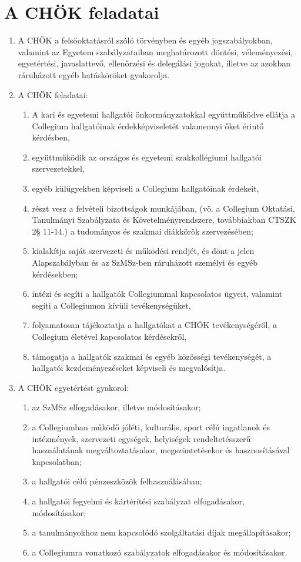 \documentclass{../styles/rulebook}
\begin{document}
\section{A CHÖK feladatai}

\begin{enumerate}
	\item A CHÖK a felsőoktatásról szóló törvényben és egyéb jogszabályokban, valamint az Egyetem szabályzataiban meghatározott döntési, véleményezési, egyetértési, javaslattevő, ellenőrzési és delegálási jogokat, illetve az azokban ráruházott egyéb hatásköröket gyakorolja.
	\item A CHÖK feladatai:
	\begin{enumerate}
		\item A kari és egyetemi hallgatói önkormányzatokkal együttműködve ellátja a Collegium hallgatóinak érdekképviseletét valamennyi őket érintő kérdésben,
		\item együttműködik az országos és egyetemi szakkollégiumi hallgatói szervezetekkel,
		\item egyéb külügyekben képviseli a Collegium hallgatóinak érdekeit,
		\item részt vesz a felvételi bizottságok munkájában, (vö. a Collegium Oktatási, Tanulmányi Szabályzata és Követelményrendszere, továbbiakban CTSZK 2§ 11-14.) a tudományos és szakmai diákkörök szervezésében;
		\item kialakítja saját szervezeti és működési rendjét, és dönt a jelen Alapszabályban és az SzMSz-ben ráruházott személyi és egyéb kérdésekben;
		\item intézi és segíti a hallgatók Collegiummal kapcsolatos ügyeit, valamint segíti a Collegiumon kívüli tevékenységüket,
		\item folyamatosan tájékoztatja a hallgatókat a CHÖK tevékenységéről, a Collegium életével kapcsolatos kérdésekről,
		\item támogatja a hallgatók szakmai és egyéb közösségi tevékenységét, a hallgatói kezdeményezéseket képviseli és megvalósítja.
	\end{enumerate}
	\item A CHÖK egyetértést gyakorol:
	\begin{enumerate}
		\item az SzMSz elfogadásakor, illetve módosításakor;
		\item a Collegiumban működő jóléti, kulturális, sport célú ingatlanok és intézmények, szervezeti egységek, helyiségek rendeltetésszerű használatának megváltoztatásakor, megszüntetésekor és hasznosításával kapcsolatban;
		\item a hallgatói célú pénzeszközök felhasználásában;
		\item a hallgatói fegyelmi és kártérítési szabályzat elfogadásakor, módosításakor;
		\item a tanulmányokhoz nem kapcsolódó szolgáltatási díjak megállapításakor;
		\item a Collegiumra vonatkozó szabályzatok elfogadásakor és módosításakor.
	\end{enumerate}
\end{enumerate}
\end{document}

